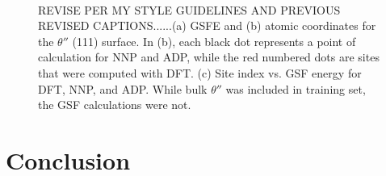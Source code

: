 \documentclass{article}
\begin{document}
\begin{figure}[H]%
\centering%
%
%
\\
%
\caption{REVISE PER MY STYLE GUIDELINES AND PREVIOUS REVISED CAPTIONS......(a) GSFE and (b) atomic coordinates for the $\theta''$ (111) surface. 
In (b), each black dot represents a point of calculation for NNP and ADP, while the red numbered dots are sites that were computed with DFT.
(c) Site index vs. GSF energy for DFT, NNP, and ADP.
While bulk $\theta''$ was included
in training set, the GSF calculations were not.}
\label{fig:GSF_ThetaDP_111}
\end{figure}


\section{Conclusion}
\end{document}
